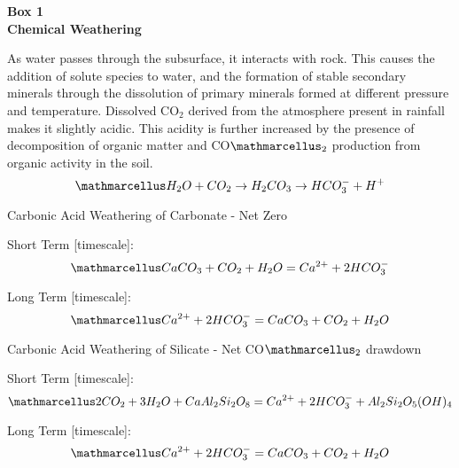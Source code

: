 \newpage

\begin{tcolorbox}[
    colback=customcolor, %
    colframe=white,      %
    sharp corners,       %
    boxrule=0pt,         %
    breakable,           %
    width=\dimexpr\textwidth+2cm\relax, %
    enlarge left by=-1cm,   %
    leftrule=0mm,        %
    rightrule=0mm,       %
    toprule=0mm,         %
    bottomrule=0mm       %
]
\textbf{\Large Box 1}
\vspace{-3mm}
\myline\\
\textbf{\Large Chemical Weathering}
\vspace{-3mm}
\myline\\
{\footnotesize
As water passes through the subsurface, it interacts with rock. This causes the addition of solute species to water, and the formation of stable secondary minerals through the dissolution of primary minerals formed at different pressure and temperature. Dissolved CO$_2$ derived from the atmosphere present in rainfall makes it slightly acidic. This acidity is further increased by the presence of decomposition of organic matter and CO$\ttmath{_2}$ production from organic activity in the soil.
\[
\ttmath{H_2O + CO_2 \rightarrow H_2CO_3 \rightarrow HCO_3^- + H^+}
\]

Carbonic Acid Weathering of Carbonate - Net Zero
    
    \begin{center}
    
    Short Term [timescale]:
    \[
    \ttmath{CaCO_3 + CO_2 + H_2O = Ca^{2+} + 2HCO_3^-}
    \]
    
    Long Term [timescale]:
    \[
    \ttmath{Ca^{2+} + 2HCO_3^- = CaCO_3 + CO_2 + H_2O}
    \]

    \end{center}
    
    
Carbonic Acid Weathering of Silicate - Net CO$\ttmath{_2}$ drawdown

    \begin{center}

    Short Term [timescale]:
    \[
    \ttmath{2CO_2 + 3H_2O + CaAl_2Si_2O_8 = Ca^{2+} + 2HCO_3^- + Al_2Si_2O_5(OH)_4}
    \]
    
    Long Term [timescale]:
    \[
    \ttmath{Ca^{2+} + 2HCO_3^- = CaCO_3 + CO_2 + H_2O}
    \]
    

\end{center}}
\end{tcolorbox}
